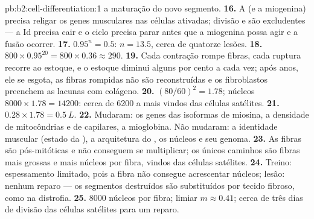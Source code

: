 \begin{solution}{pb:b2:cell-differentiation:1}
a maturação do novo segmento.
\textbf{16.} A  (e a miogenina) precisa religar os genes musculares
nas células ativadas; divisão e  são excludentes --- a Id
precisa cair e o ciclo precisa parar antes que a miogenina possa agir
e a fusão ocorrer.
\textbf{17.} $0.95^{n} = 0.5$: $n = 13.5$, cerca de quatorze lesões.
\textbf{18.} $800\times 0.95^{20} = 800\times 0.36 \approx 290$.
\textbf{19.} Cada contração rompe fibras, cada ruptura recorre ao
estoque, e o estoque diminui alguns por cento a cada vez; após anos,
ele se esgota, as fibras rompidas não são reconstruídas e os
fibroblastos preenchem as lacunas com colágeno.
\textbf{20.} $(80/60)^{2} = 1.78$; núcleos $8000\times 1.78 = \num{14200}$:
cerca de \num{6200} a mais vindos das células satélites.
\textbf{21.} $0.28\times 1.78 = \qty{0.5}{L}$.
\textbf{22.} Mudaram: os genes das isoformas de miosina, a densidade de
mitocôndrias e de capilares, a mioglobina. Não mudaram: a identidade
muscular (estado da ), a arquitetura do , os núcleos e seu
genoma.
\textbf{23.} As fibras são pós-mitóticas e não conseguem se
multiplicar; os únicos caminhos são fibras mais grossas e mais núcleos
por fibra, vindos das células satélites.
\textbf{24.} Treino: espessamento limitado, pois a fibra não consegue
acrescentar núcleos; lesão: nenhum reparo --- os segmentos destruídos
são substituídos por tecido fibroso, como na distrofia.
\textbf{25.} \num{8000} núcleos por fibra; limiar $m \approx 0.41$;
cerca de três dias de divisão das células satélites para um reparo.
\end{solution}
